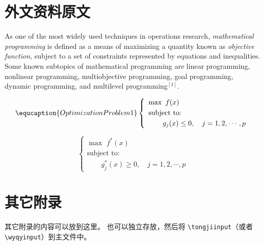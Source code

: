 
\chapter{外文资料原文}
\label{chap:appx:1}
As one of the most widely used techniques in operations research, {\em mathematical programming} is defined as a means of maximizing a quantity known as {\em objective function}, subject to a set of constraints represented by equations and inequalities.
Some known subtopics of mathematical programming are linear programming, nonlinear programming, multiobjective programming, goal programming, dynamic programming, and multilevel programming$^{[1]}$.


\begin{equation} \equcaption{Optimization Problem 1} %
    \left\{ \begin{array}{l}
        \max \,\,f(x)      \\ [0.1 cm]
        \mbox{subject to:} \\ [0.1 cm]
        \qquad g_j(x)\le 0, \quad j=1,2,\cdots,p
    \end{array} \right.
\end{equation}

\begin{equation}
    \left\{ \begin{array}{l}
        \max \,\,f^\ast(x) \\ [0.1 cm]
        \mbox{subject to:} \\ [0.1 cm]
        \qquad g_j^\ast(x)\ge 0, \quad j=1,2,\cdots,p
    \end{array} \right.
\end{equation}

\chapter{其它附录}
\label{chap:appx:2}
其它附录的内容可以放到这里。
也可以独立存放，然后将 \verb|\tongjiinput|（或者 \verb|\wyqyinput|）到主文件中。
